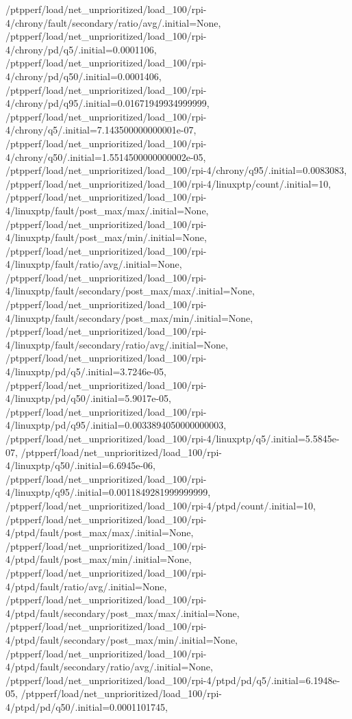 {    /ptpperf/load/net_unprioritized/load_100/rpi-4/chrony/fault/secondary/ratio/avg/.initial=None,
    /ptpperf/load/net_unprioritized/load_100/rpi-4/chrony/pd/q5/.initial=0.0001106,
    /ptpperf/load/net_unprioritized/load_100/rpi-4/chrony/pd/q50/.initial=0.0001406,
    /ptpperf/load/net_unprioritized/load_100/rpi-4/chrony/pd/q95/.initial=0.01671949934999999,
    /ptpperf/load/net_unprioritized/load_100/rpi-4/chrony/q5/.initial=7.143500000000001e-07,
    /ptpperf/load/net_unprioritized/load_100/rpi-4/chrony/q50/.initial=1.5514500000000002e-05,
    /ptpperf/load/net_unprioritized/load_100/rpi-4/chrony/q95/.initial=0.0083083,
    /ptpperf/load/net_unprioritized/load_100/rpi-4/linuxptp/count/.initial=10,
    /ptpperf/load/net_unprioritized/load_100/rpi-4/linuxptp/fault/post_max/max/.initial=None,
    /ptpperf/load/net_unprioritized/load_100/rpi-4/linuxptp/fault/post_max/min/.initial=None,
    /ptpperf/load/net_unprioritized/load_100/rpi-4/linuxptp/fault/ratio/avg/.initial=None,
    /ptpperf/load/net_unprioritized/load_100/rpi-4/linuxptp/fault/secondary/post_max/max/.initial=None,
    /ptpperf/load/net_unprioritized/load_100/rpi-4/linuxptp/fault/secondary/post_max/min/.initial=None,
    /ptpperf/load/net_unprioritized/load_100/rpi-4/linuxptp/fault/secondary/ratio/avg/.initial=None,
    /ptpperf/load/net_unprioritized/load_100/rpi-4/linuxptp/pd/q5/.initial=3.7246e-05,
    /ptpperf/load/net_unprioritized/load_100/rpi-4/linuxptp/pd/q50/.initial=5.9017e-05,
    /ptpperf/load/net_unprioritized/load_100/rpi-4/linuxptp/pd/q95/.initial=0.0033894050000000003,
    /ptpperf/load/net_unprioritized/load_100/rpi-4/linuxptp/q5/.initial=5.5845e-07,
    /ptpperf/load/net_unprioritized/load_100/rpi-4/linuxptp/q50/.initial=6.6945e-06,
    /ptpperf/load/net_unprioritized/load_100/rpi-4/linuxptp/q95/.initial=0.0011849281999999999,
    /ptpperf/load/net_unprioritized/load_100/rpi-4/ptpd/count/.initial=10,
    /ptpperf/load/net_unprioritized/load_100/rpi-4/ptpd/fault/post_max/max/.initial=None,
    /ptpperf/load/net_unprioritized/load_100/rpi-4/ptpd/fault/post_max/min/.initial=None,
    /ptpperf/load/net_unprioritized/load_100/rpi-4/ptpd/fault/ratio/avg/.initial=None,
    /ptpperf/load/net_unprioritized/load_100/rpi-4/ptpd/fault/secondary/post_max/max/.initial=None,
    /ptpperf/load/net_unprioritized/load_100/rpi-4/ptpd/fault/secondary/post_max/min/.initial=None,
    /ptpperf/load/net_unprioritized/load_100/rpi-4/ptpd/fault/secondary/ratio/avg/.initial=None,
    /ptpperf/load/net_unprioritized/load_100/rpi-4/ptpd/pd/q5/.initial=6.1948e-05,
    /ptpperf/load/net_unprioritized/load_100/rpi-4/ptpd/pd/q50/.initial=0.0001101745,
}
